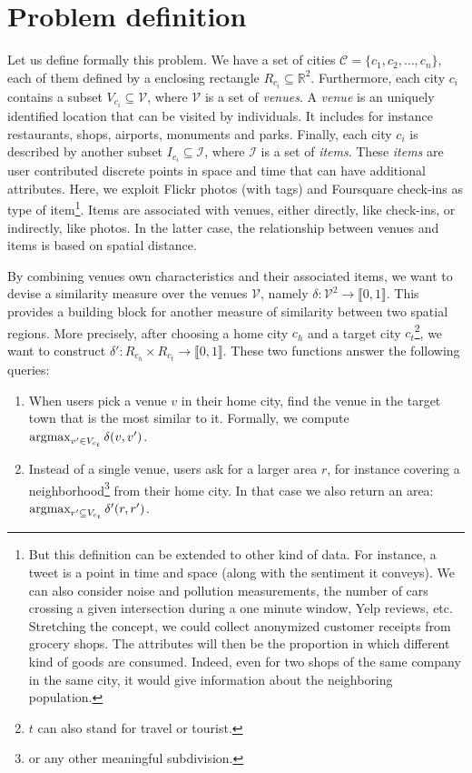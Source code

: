 \section{Problem definition}
\label{sec:problem}

Let us define formally this problem. We have a set of cities $\mathcal{C} =
\{c_1, c_2, \ldots, c_n\}$, each of them defined by a enclosing rectangle
$R_{c_i} \subseteq \mathbb{R}^2$. Furthermore, each city $c_i$ contains a
subset $V_{c_i} \subseteq \mathcal{V}$, where $\mathcal{V}$ is a set of
\emph{venues}. A \emph{venue} is an uniquely identified location that can be
visited by individuals. It includes for instance restaurants, shops, airports,
monuments and parks. Finally, each city $c_i$ is described by another subset
$I_{c_i} \subseteq \mathcal{I}$, where $\mathcal{I}$ is a set of \emph{items}.
These \emph{items} are user contributed discrete points in space and time that
can have additional attributes. Here, we exploit Flickr photos (with tags) and
Foursquare check-ins as type of item\footnote{But this definition can be
    extended to other kind of data. For instance, a tweet is a point in time
    and space (along with the sentiment it conveys). We can also consider
    noise and pollution measurements, the number of cars crossing a given
    intersection during a one minute window, Yelp reviews, etc. Stretching the
    concept, we could collect anonymized customer receipts from grocery shops.
    The attributes will then be the proportion in which different kind of
    goods are consumed. Indeed, even for two shops of the same company in the
    same city, it would give information about the neighboring population.}.
Items are associated with venues, either directly, like check-ins, or
indirectly, like photos. In the latter case, the relationship between venues
and items is based on spatial distance.

By combining venues own characteristics and their associated items, we want to
devise a similarity measure over the venues $\mathcal{V}$, namely $\delta:
\mathcal{V}^2 \rightarrow \llbracket 0, 1 \rrbracket $. This provides a
building block for another measure of similarity between two spatial regions.
More precisely, after choosing a home city $c_h$ and a target city
$c_t$\footnote{$t$ can also stand for travel or tourist.}, we want to
construct $\delta': R_{c_h} \times R_{c_t} \rightarrow \llbracket 0, 1 \rrbracket$.
These two functions answer the following queries:

\begin{enumerate}
\item When users pick a venue $v$ in their home city, find the venue in the
	target town that is the most similar to it. Formally, we compute
	$\operatorname*{argmax}_{v' \in V_{c_t}} \delta(v, v')$.\label{q:point}
\item Instead of a single venue, users ask for a larger area $r$, for instance
	covering a neighborhood\footnote{or any other meaningful subdivision.}
	from their home city. In that case we also return an area:
	$\operatorname*{argmax}_{r' \subseteq V_{c_t}} \delta'(r, r')$.\label{q:space}
\end{enumerate}


